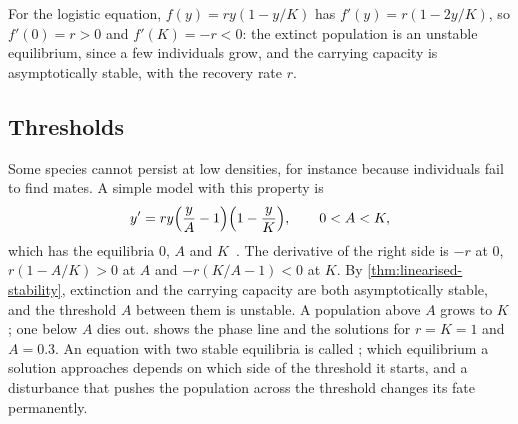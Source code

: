 For the logistic equation, $f(y)=ry(1-y/K)$ has $f'(y)=r(1-2y/K)$, so $f'(0)=r>0$ and $f'(K)=-r<0$: the extinct population is an unstable equilibrium, since a few individuals grow, and the carrying capacity is asymptotically stable, with the recovery rate $r$.

\subsection{Thresholds}

Some species cannot persist at low densities, for instance because individuals fail to find mates. A simple model with this property is
\[
y'=ry\Bigl(\frac yA-1\Bigr)\Bigl(1-\frac yK\Bigr),\qquad0<A<K,
\]
which has the equilibria $0$, $A$ and $K$~\cite[Sect.~2.5]{boyce2017}. The derivative of the right side is $-r$ at $0$, $r(1-A/K)>0$ at $A$ and $-r(K/A-1)<0$ at $K$. By \cref{thm:linearised-stability}, extinction and the carrying capacity are both asymptotically stable, and the threshold $A$ between them is unstable. A population above $A$ grows to $K$; one below $A$ dies out.  shows the phase line and the solutions for $r=K=1$ and $A=0.3$. An equation with two stable equilibria is called ; which equilibrium a solution approaches depends on which side of the threshold it starts, and a disturbance that pushes the population across the threshold changes its fate permanently.

